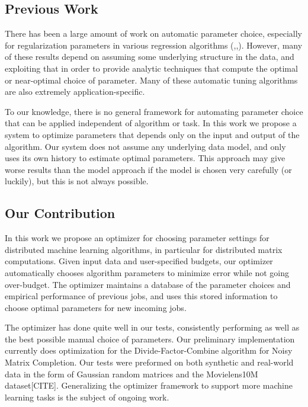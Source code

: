 \subsection{Previous Work}
There has been a large amount of work on automatic parameter choice, especially for regularization parameters in various regression algorithms (\cite{CI12},\cite{GEE10},\cite{BBGH07}). However, many of these results depend on assuming some underlying structure in the data, and exploiting that in order to provide analytic techniques that compute the optimal or near-optimal choice of parameter. Many of these automatic tuning algorithms are also extremely application-specific. 

To our knowledge, there is no general framework for automating parameter choice that can be applied independent of algorithm or task. In this work we propose a system to optimize parameters that depends only on the input and output of the algorithm. Our system does not assume any underlying data model, and only uses its own history to estimate optimal parameters. This approach may give worse results than the model approach if the model is chosen very carefully (or luckily), but this is not always possible.

\subsection{Our Contribution}
In this work we propose an optimizer for choosing parameter settings for distributed machine learning algorithms, in particular for distributed matrix computations. Given input data and user-specified budgets, our optimizer automatically chooses algorithm parameters to minimize error while not going over-budget. The optimizer maintains a database of the parameter choices and empirical performance of previous jobs, and uses this stored information to choose optimal parameters for new incoming jobs.

The optimizer has done quite well in our tests, consistently performing as well as the best possible manual choice of parameters. Our preliminary implementation currently does optimization for the Divide-Factor-Combine algorithm for Noisy Matrix Completion. Our tests were preformed on both synthetic and real-world data in the form of Gaussian random matrices and the Movielens10M dataset[CITE]. Generalizing the optimizer framework to support more machine learning tasks is the subject of ongoing work.
